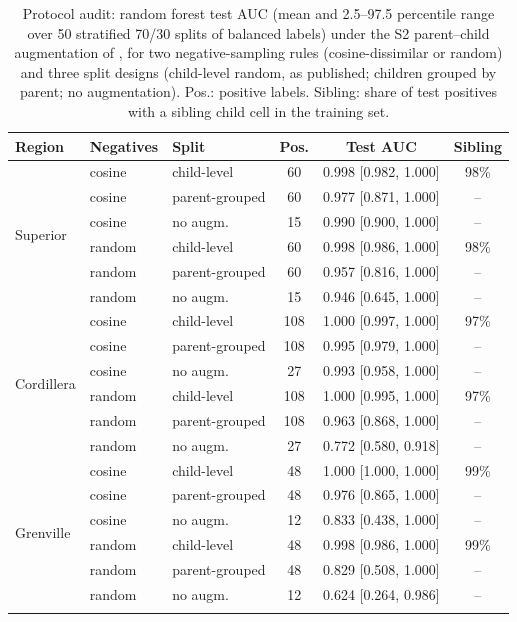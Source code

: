\documentclass[pdflatex,sn-apa]{sn-jnl}
\begin{document}
\begin{table}[t]
\caption{Protocol audit: random forest test AUC (mean and 2.5--97.5 percentile range over 50 stratified 70/30 splits of balanced labels) under the S2 parent--child augmentation of \citet{Parsa2024}, for two negative-sampling rules (cosine-dissimilar or random) and three split designs (child-level random, as published; children grouped by parent; no augmentation). Pos.: positive labels. Sibling: share of test positives with a sibling child cell in the training set.}\label{tab:audit}
\scriptsize
\setlength{\tabcolsep}{2.5pt}
\begin{tabular*}{\textwidth}{@{\extracolsep\fill}lllccc}
\toprule
Region & Negatives & Split & Pos. & Test AUC & Sibling \\
\midrule
\multirow{6}{*}{Superior} & cosine & child-level & 60 & 0.998 [0.982, 1.000] & 98\% \\
 & cosine & parent-grouped & 60 & 0.977 [0.871, 1.000] & -- \\
 & cosine & no augm. & 15 & 0.990 [0.900, 1.000] & -- \\
 & random & child-level & 60 & 0.998 [0.986, 1.000] & 98\% \\
 & random & parent-grouped & 60 & 0.957 [0.816, 1.000] & -- \\
 & random & no augm. & 15 & 0.946 [0.645, 1.000] & -- \\
\midrule
\multirow{6}{*}{Cordillera} & cosine & child-level & 108 & 1.000 [0.997, 1.000] & 97\% \\
 & cosine & parent-grouped & 108 & 0.995 [0.979, 1.000] & -- \\
 & cosine & no augm. & 27 & 0.993 [0.958, 1.000] & -- \\
 & random & child-level & 108 & 1.000 [0.995, 1.000] & 97\% \\
 & random & parent-grouped & 108 & 0.963 [0.868, 1.000] & -- \\
 & random & no augm. & 27 & 0.772 [0.580, 0.918] & -- \\
\midrule
\multirow{6}{*}{Grenville} & cosine & child-level & 48 & 1.000 [1.000, 1.000] & 99\% \\
 & cosine & parent-grouped & 48 & 0.976 [0.865, 1.000] & -- \\
 & cosine & no augm. & 12 & 0.833 [0.438, 1.000] & -- \\
 & random & child-level & 48 & 0.998 [0.986, 1.000] & 99\% \\
 & random & parent-grouped & 48 & 0.829 [0.508, 1.000] & -- \\
 & random & no augm. & 12 & 0.624 [0.264, 0.986] & -- \\
\botrule
\end{tabular*}
\end{table}
\end{document}
